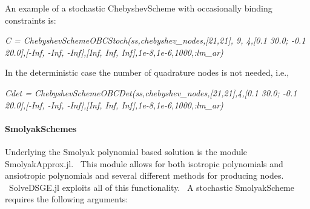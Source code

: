 \documentclass[notitlepage,11pt]{article}
\begin{document}
\bigskip

An example of a stochastic ChebyshevScheme with occasionally binding
constraints is:

\bigskip

\textit{C = ChebyshevSchemeOBCStoch(ss,chebyshev\_nodes,[21,21], 9, 4,[0.1
30.0; -0.1 20.0],[-Inf, -Inf, -Inf],[Inf, Inf, Inf],1e-8,1e-6,1000,:lm\_ar)}

\bigskip

In the deterministic case the number of quadrature nodes is not needed, i.e.,

\bigskip

\textit{Cdet = ChebyshevSchemeOBCDet(ss,chebyshev\_nodes,[21,21],4,[0.1
30.0; -0.1 20.0],[-Inf, -Inf, -Inf],[Inf, Inf, Inf],1e-8,1e-6,1000,:lm\_ar)}

\paragraph{SmolyakSchemes}

Underlying the Smolyak polynomial based solution is the module
SmolyakApprox.jl. \ This module allows for both isotropic polynomials and
ansiotropic polynomials and several different methods for producing nodes. \
SolveDSGE.jl exploits all of this functionality. \ A stochastic
SmolyakScheme requires the following arguments:
\end{document}
